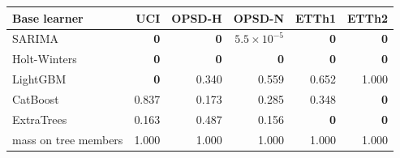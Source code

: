 \begin{tabular}{lrrrrr}
\toprule
Base learner & UCI & OPSD-H & OPSD-N & ETTh1 & ETTh2 \\
\midrule
SARIMA & \textbf{0} & \textbf{0} & $5.5{\times}10^{-5}$ & \textbf{0} & \textbf{0} \\
Holt-Winters & \textbf{0} & \textbf{0} & \textbf{0} & \textbf{0} & \textbf{0} \\
LightGBM & \textbf{0} & 0.340 & 0.559 & 0.652 & 1.000 \\
CatBoost & 0.837 & 0.173 & 0.285 & 0.348 & \textbf{0} \\
ExtraTrees & 0.163 & 0.487 & 0.156 & \textbf{0} & \textbf{0} \\
\midrule
mass on tree members & 1.000 & 1.000 & 1.000 & 1.000 & 1.000 \\
\bottomrule
\end{tabular}
